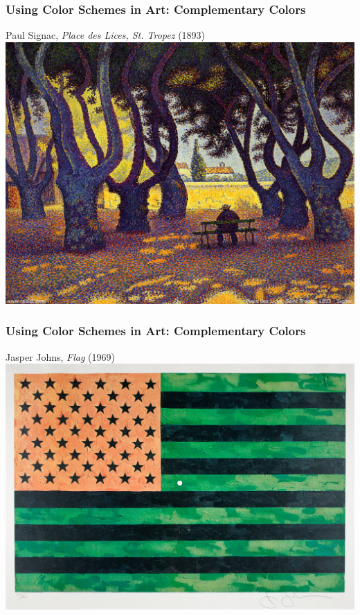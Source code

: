 \documentclass{beamer} %
\begin{document}
\begin{frame}\frametitle{Using Color Schemes in Art: Complementary Colors}
	\centering
	
	Paul Signac, \emph{Place des Lices, St. Tropez} (1893)\\
	
	\includegraphics[width=0.95\linewidth]{signac}
	
\end{frame}


\begin{frame}\frametitle{Using Color Schemes in Art: Complementary Colors}
	\centering
	
	Jasper Johns, \emph{Flag} (1969)\\
	
	\includegraphics[width=\linewidth]{flag}
	
\end{frame}
\end{document}
